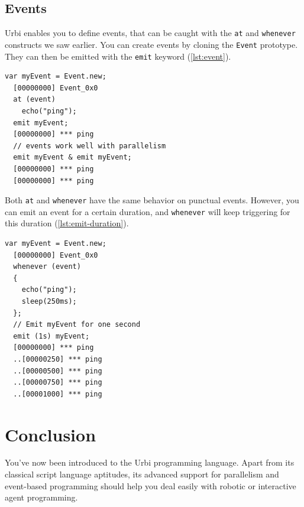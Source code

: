 \documentclass[openright,twoside,12pt]{report}
\newcommand{\Cxx}{C++\xspace}
\newcommand{\urbi}{Urbi\xspace}
\newcommand{\lst}[1]{\autoref{lst:#1}}
\begin{document}
\section{Events}

\urbi enables you to define events, that can be caught with the
\lstinline|at| and \lstinline|whenever| constructs we saw earlier. You
can create events by cloning the \lstinline|Event| prototype. They can
then be emitted with the \lstinline|emit| keyword (\lst{event}).

\begin{lstlisting}[caption=Using events, label=lst:event]
  var myEvent = Event.new;
  [00000000] Event_0x0
  at (event)
    echo("ping");
  emit myEvent;
  [00000000] *** ping
  // events work well with parallelism
  emit myEvent & emit myEvent;
  [00000000] *** ping
  [00000000] *** ping
\end{lstlisting}

Both \lstinline|at| and \lstinline|whenever| have the same behavior on
punctual events. However, you can emit an event for a certain
duration, and \lstinline|whenever| will keep triggering for this
duration (\lst{emit-duration}).

\begin{lstlisting}[caption=Emitting events with a duration,
  label=lst:emit-duration]
  var myEvent = Event.new;
  [00000000] Event_0x0
  whenever (event)
  {
    echo("ping");
    sleep(250ms);
  };
  // Emit myEvent for one second
  emit (1s) myEvent;
  [00000000] *** ping
  ..[00000250] *** ping
  ..[00000500] *** ping
  ..[00000750] *** ping
  ..[00001000] *** ping
\end{lstlisting}








\chapter{Conclusion}

You've now been introduced to the \urbi programming language. Apart
from its classical script language aptitudes, its advanced support for
parallelism and event-based programming should help you deal easily
with robotic or interactive agent programming.
\end{document}
